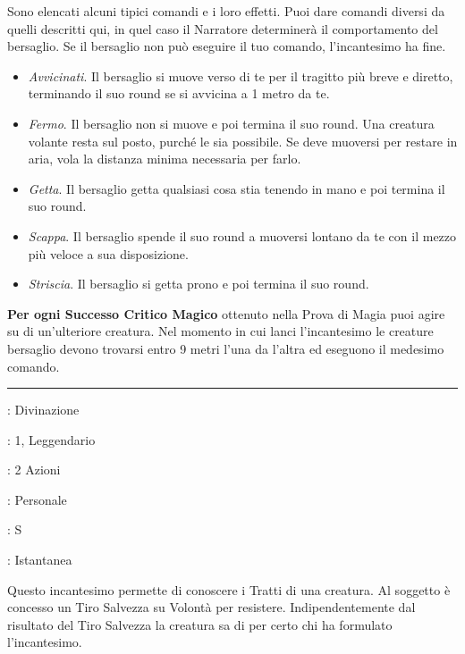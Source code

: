 \begin{multicols}{2}
Sono elencati alcuni tipici comandi e i loro effetti. Puoi dare comandi diversi da quelli descritti qui, in quel caso il Narratore determinerà il comportamento del bersaglio. Se il bersaglio non può eseguire il tuo comando, l'incantesimo ha fine.

\begin{itemize}[leftmargin=*] \setlength{\itemsep}{0pt}
	\item \emph{Avvicinati}. Il bersaglio si muove verso di te per il tragitto più breve e diretto, terminando il suo round se si avvicina a 1 metro da te.
	\item \emph{Fermo}. Il bersaglio non si muove e poi termina il suo round. Una creatura volante resta sul posto, purché le sia possibile. Se deve muoversi per restare in aria, vola la distanza minima necessaria per farlo.
	\item \emph{Getta}. Il bersaglio getta qualsiasi cosa stia tenendo in mano e poi termina il suo round.
	\item \emph{Scappa}. Il bersaglio spende il suo round a muoversi lontano da te con il mezzo più veloce a sua disposizione.
	\item \emph{Striscia}. Il bersaglio si getta prono e poi termina il suo round.
\end{itemize}

\textbf{Per ogni Successo Critico Magico} ottenuto nella Prova di Magia puoi agire su di un'ulteriore creatura. Nel momento in cui lanci l'incantesimo le creature bersaglio devono trovarsi entro 9 metri l'una da l'altra ed eseguono il medesimo comando.

\smallskip\noindent\rule{\linewidth}{2pt} \hypertarget{Conoscere i Tratti}{}\medskip{}
\noindent
\begin{description}[noitemsep, topsep=0pt, parsep=0pt, partopsep=0pt, leftmargin=0cm, labelwidth=2.8cm]
	\item[\textbf{Lista di Magia}]: Divinazione
	\item[\textbf{Livello}]: 1, Leggendario
	\item[\textbf{T. di Lancio}]: 2 Azioni
	\item[\textbf{Gittata}]: Personale
	\item[\textbf{Componenti}]: S
	\item[\textbf{Durata}]: Istantanea
\end{description}

Questo incantesimo permette di conoscere i Tratti di una creatura. Al soggetto è concesso un Tiro Salvezza su Volontà per resistere. Indipendentemente dal risultato del Tiro Salvezza la creatura sa di per certo chi ha formulato l'incantesimo.


\end{multicols}
